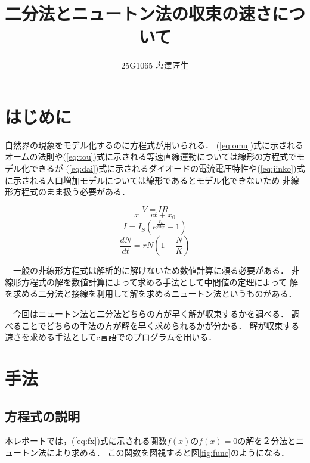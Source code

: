 \documentclass[uplatex]{jsarticle}
\begin{document}
\title{二分法とニュートン法の収束の速さについて}
\author{25G1065 塩澤匠生}

\maketitle


\section{はじめに}
自然界の現象をモデル化するのに方程式が用いられる．
(\ref{eq:omu})式に示されるオームの法則\cite{omu}や(\ref{eq:tou})式に示される等速直線運動\cite{toutyo}については線形の方程式でモデル化できるが
(\ref{eq:dai})式に示されるダイオードの電流電圧特性\cite{daio}や(\ref{eq:jinko})式に示される人口増加\cite{jinko}モデルについては線形であるとモデル化できないため
非線形方程式のまま扱う必要がある．

\begin{equation}
V = IR\label{eq:omu}
\end{equation}
\begin{equation}
x = vt + x_0\label{eq:tou}
\end{equation}
\begin{equation}
I = I_S (e^{\frac{V_D}{n V_T}} - 1)\label{eq:dai}
\end{equation}
\begin{equation}
\frac{dN}{dt} = rN \left(1 - \frac{N}{K}\right)\label{eq:jinko}
\end{equation}


　一般の非線形方程式は解析的に解けないため数値計算に頼る必要がある．
非線形方程式の解を数値計算によって求める手法として中間値の定理によって
解を求める二分法\cite{nibun}と接線を利用して解を求めるニュートン法\cite{nyutonn}というものがある．

　今回はニュートン法と二分法どちらの方が早く解が収束するかを調べる．
調べることでどちらの手法の方が解を早く求められるかが分かる．
解が収束する速さを求める手法としてc言語でのプログラムを用いる．
\section{手法}

\subsection{方程式の説明}

本レポートでは，(\ref{eq:fx})式に示される関数$f(x)$の$f(x)=0$の解を２分法とニュートン法により求める．
この関数を図視すると図\ref{fig:func}のようになる．
\end{document}
